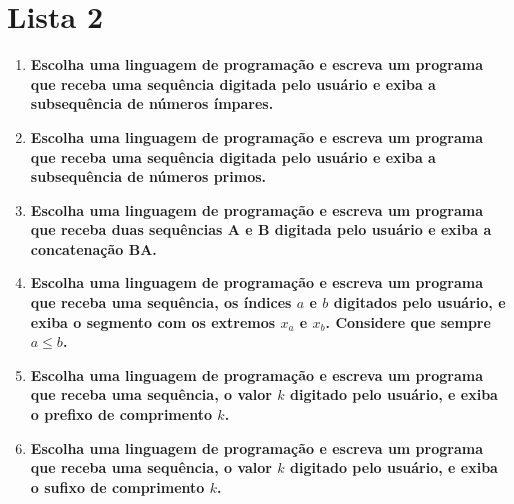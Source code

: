 \section*{Lista 2}

\begin{enumerate}
	\item \textbf{Escolha uma linguagem de programação e escreva um programa que receba	uma sequência digitada pelo usuário e exiba a subsequência de números ímpares.}
	
	
	\item \textbf{Escolha uma linguagem de programação e escreva um programa que receba	uma sequência digitada pelo usuário e exiba a subsequência de números primos.}
	
	
	\item \textbf{Escolha uma linguagem de programação e escreva um programa que receba	duas sequências A e B digitada pelo usuário e exiba a concatenação BA.}
	
	
	\item \textbf{Escolha uma linguagem de programação e escreva um programa que receba	uma sequência, os índices $a$ e $b$ digitados pelo usuário, e exiba o segmento com os extremos $x_a$ e $x_b$. Considere que sempre $a \leq b$.}
	
	
	\item \textbf{Escolha uma linguagem de programação e escreva um programa que receba	uma sequência, o valor $k$ digitado pelo usuário, e exiba o prefixo de comprimento $k$.}
	
	
	\item \textbf{Escolha uma linguagem de programação e escreva um programa que receba	uma sequência, o valor $k$ digitado pelo usuário, e exiba o sufixo de comprimento $k$.}
	
	
\end{enumerate}
